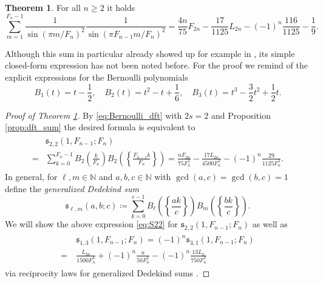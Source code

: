 \documentclass[]{interact}
\newcommand{\bbN}{\mathbb{N}}
\newcommand{\frs}{\mathfrak{s}}
\theoremstyle{definition}
\newtheorem{thm}{Theorem}[section]
\numberwithin{table}{section} %
\numberwithin{figure}{section}
\begin{document}
\begin{thm} \label{thm:closed_form}
    For all $n \geq 2$ it holds
    $$
    \sum_{m=1}^{F_n-1} \frac1{\sin(\pi m/F_n)^2} \frac1{\sin(\pi F_{n-1}m/F_n)^2} = \frac{4n}{75} F_{2n} - \frac{17}{1125}L_{2n} - (-1)^n \frac{116}{1125} - \frac19.
    $$
\end{thm}

Although this sum in particular already showed up for example in \cite{BTY12, Bor17, HKP21}, its simple closed-form expression has not been noted before. For the proof we remind of the explicit expressions for the Bernoulli polynomials
$$
B_1(t) = t-\frac12, \quad B_2(t) = t^2-t+\frac16, \quad B_3(t) = t^3-\frac32t^2+\frac12t.
$$

\begin{proof} [Proof of Theorem \ref{thm:closed_form}]
    By \eqref{eq:Bernoulli_dft} with $2s=2$ and Proposition \ref{prop:dft_sum} the desired formula is equivalent to
    \begin{align} \label{eq:S22}
        \begin{split}
            & \frs^{}_{2, 2}(1, F_{n-1}; F_n) \\
            = & \sum_{k = 0}^{F_n-1} B_2\left(\frac k{F_n}\right) B_2\left(\left\{\frac{F_{n-1} k}{F_n}\right\}\right) = \frac{n F_{2n}}{75 F_n^3} - \frac{17L_{2n}}{4500F_n^3}-(-1)^n\frac{29}{1125 F_n^3}.
        \end{split}
    \end{align}
    In general, for $\ell, m \in \bbN$ and $a, b, c \in \bbN$ with $\gcd(a, c) = \gcd(b, c) = 1$ define the \emph{generalized Dedekind sum}
    $$
    \frs^{}_{\ell, m}(a, b; c) \coloneqq \sum_{k = 0}^{c-1} B_\ell\left(\left\{\frac{a k}{c}\right\}\right) B_m\left(\left\{\frac{b k}{c}\right\}\right).
    $$
    We will show the above expression \eqref{eq:S22} for $\frs^{}_{2,2}(1, F_{n-1}; F_n)$ as well as
    \begin{align} \label{eq:S13}
	\begin{split}
	    & \frs^{}_{1, 3}(1, F_{n-1}; F_n) = (-1)^n \frs^{}_{3, 1}(1, F_{n-1}; F_n) \\
	= ~ & \frac{L_{3n}}{1500F_n^3} + (-1)^n\frac{n}{50F_n^2} - (-1)^n \frac{13L_n}{750F_n^3}
	\end{split}
    \end{align}
    via reciprocity laws for generalized Dedekind sums \cite{Apo52, Bec03, BC11, BY02, BZ04, Die57, Die84, Die96, HWZ95, Mac08, Mik57, RG72, Tak79}.
    

\end{proof}
\end{document}
